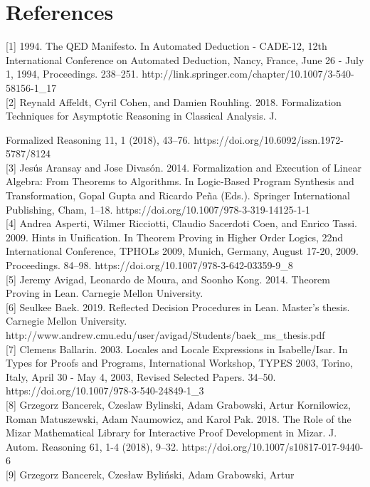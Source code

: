 \documentclass[
]{article}
\begin{document}
\section{References}\label{references}

{[}1{]} 1994. The QED Manifesto. In Automated Deduction - CADE-12, 12th
International Conference on Automated Deduction, Nancy, France, June 26
- July 1, 1994, Proceedings. 238--251.
http://link.springer.com/chapter/10.1007/3-540-58156-1\_17\\
{[}2{]} Reynald Affeldt, Cyril Cohen, and Damien Rouhling. 2018.
Formalization Techniques for Asymptotic Reasoning in Classical Analysis.
J.

Formalized Reasoning 11, 1 (2018), 43--76.
https://doi.org/10.6092/issn.1972-5787/8124\\
{[}3{]} Jesús Aransay and Jose Divasón. 2014. Formalization and
Execution of Linear Algebra: From Theorems to Algorithms. In Logic-Based
Program Synthesis and Transformation, Gopal Gupta and Ricardo Peña
(Eds.). Springer International Publishing, Cham, 1--18.
https://doi.org/10.1007/978-3-319-14125-1-1\\
{[}4{]} Andrea Asperti, Wilmer Ricciotti, Claudio Sacerdoti Coen, and
Enrico Tassi. 2009. Hints in Unification. In Theorem Proving in Higher
Order Logics, 22nd International Conference, TPHOLs 2009, Munich,
Germany, August 17-20, 2009. Proceedings. 84--98.
https://doi.org/10.1007/978-3-642-03359-9\_8\\
{[}5{]} Jeremy Avigad, Leonardo de Moura, and Soonho Kong. 2014. Theorem
Proving in Lean. Carnegie Mellon University.\\
{[}6{]} Seulkee Baek. 2019. Reflected Decision Procedures in Lean.
Master's thesis. Carnegie Mellon University.
http://www.andrew.cmu.edu/user/avigad/Students/baek\_ms\_thesis.pdf\\
{[}7{]} Clemens Ballarin. 2003. Locales and Locale Expressions in
Isabelle/Isar. In Types for Proofs and Programs, International Workshop,
TYPES 2003, Torino, Italy, April 30 - May 4, 2003, Revised Selected
Papers. 34--50. https://doi.org/10.1007/978-3-540-24849-1\_3\\
{[}8{]} Grzegorz Bancerek, Czeslaw Bylinski, Adam Grabowski, Artur
Kornilowicz, Roman Matuszewski, Adam Naumowicz, and Karol Pak. 2018. The
Role of the Mizar Mathematical Library for Interactive Proof Development
in Mizar. J. Autom. Reasoning 61, 1-4 (2018), 9--32.
https://doi.org/10.1007/s10817-017-9440-6\\
{[}9{]} Grzegorz Bancerek, Czesław Byliński, Adam Grabowski, Artur
\end{document}
